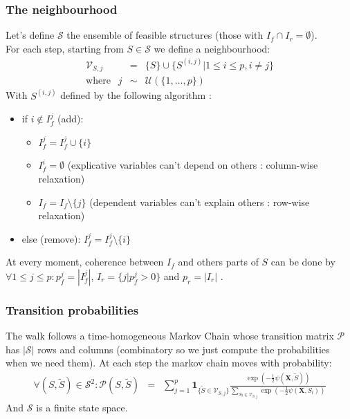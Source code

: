 \documentclass[11pt,a4paper]{article}
\begin{document}
	\subsubsection{The neighbourhood}
	Let's define $\mathcal{S}$ the ensemble of feasible structures (those with $I_f\cap I_r=\emptyset$).
	\\
	For each step, starting from $S \in \mathcal{S}$ we define a neighbourhood:
		\begin{eqnarray}
		\mathcal{V}_{S,j}&=& \{S \}\cup \{ S^{(i,j)} |1\leq i \leq p, i\neq j  \} \\
		\textrm{where }\ \ j &\sim & \mathcal{U}(\{1,\dots,p\}) 
	\end{eqnarray}	
	With $S^{(i,j)}$ defined by the following algorithm :
	\begin{itemize}
		\item if $i \notin I_f^j$ (add): 
			\begin{itemize}
				\item $I_f^j=I_f^j\cup \{i\}$
				\item $I_f^i=\emptyset$ (explicative variables can't depend on others : column-wise relaxation)
				\item $I_f=I_f \setminus \{j\}$ (dependent variables can't explain others : row-wise relaxation) 
			\end{itemize}			 
		\item else (remove): $I_f^j=I_f^j\setminus \{i\}$
	\end{itemize}
	
	\smallskip
	At every moment, coherence between $I_f$ and others parts of $S$ can be done by $\forall 1\leq j\leq p :  p_f^j=|I_f^j|$, $I_r=\{j |p_f^j>0 \}$ and $p_r= |I_r|$ .
		
	\subsubsection{Transition probabilities}
	
	The walk follows a time-homogeneous Markov Chain whose transition matrix $\mathcal{P}$ has $|\mathcal{S}|$ rows and columns (combinatory so we just compute the probabilities when we need them).
	At each step the markov chain moves with probability:
	\begin{eqnarray}
			\forall (S,\tilde{S}) \in \mathcal{S}^2 : \mathcal{P}(S,\tilde{S})&=&\sum_{j=1}^p \mathbf{1}_{ \{\tilde{S}\in \mathcal{V}_{S,j}\} }\frac{\exp(-\frac{1}{2}\psi(\boldsymbol{X},\tilde{S}))}{\sum_{S_l\in \mathcal{V}_{S,j}}\exp(-\frac{1}{2}\psi(\boldsymbol{X},S_l))} 
	\end{eqnarray}
	And $\mathcal{S}$ is a finite state space.%
	 
\end{document}
